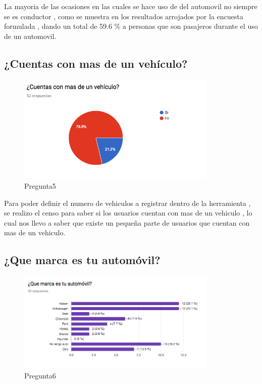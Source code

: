 La mayoria de las ocasiones en las cuales se hace uso de del automovil no siempre se es conductor , como se muestra en los resultados arrojados por la encuesta formulada , dando un total de 59.6 \% a personas que son pasajeros durante el uso de un automovil.\\


\subsection{¿Cuentas con mas de un vehículo?}

\begin{figure}[htbp!]
	\begin{center}
		\includegraphics[width=0.85\textwidth]{DisenoEstructura/imagenes/Pregunta5}
		\caption{Pregunta5}
		\label{DE/FO/Pregunta5}
	\end{center}
\end{figure}

Para poder definir el numero de vehiculos a registrar dentro de la herramienta , se realizo el censo para saber si los usuarios cuentan con mas de un vehiculo , lo cual nos llevo a saber que existe un pequeña parte de usuarios que cuentan con mas de un vehiculo.\\

\subsection{¿Que marca es tu automóvil?}

\begin{figure}[htbp!]
	\begin{center}
		\includegraphics[width=0.85\textwidth]{DisenoEstructura/imagenes/Pregunta6}
		\caption{Pregunta6}
		\label{DE/FO/Pregunta6}
	\end{center}
\end{figure}

